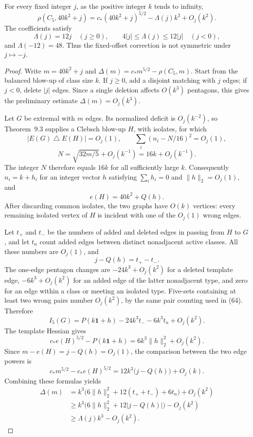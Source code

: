 \begin{theorem}\label{thm:fixed-offset}
For every fixed integer $j$, as the positive integer $k$ tends to infinity,
\begin{equation}\tag{69}\label{eq:fixed-offset-asymptotic}
 \rho(C_5,40k^2+j)
   =c_\ast(40k^2+j)^{5/2}-\Lambda(j)k^3+O_j(k^2).
\end{equation}
The coefficients satisfy
\[
 \Lambda(j)=12j\quad(j\geq0),\qquad
 4|j|\leq\Lambda(j)\leq12|j|\quad(j<0),
\]
and $\Lambda(-12)=48$. Thus the fixed-offset correction is not symmetric
under $j\mapsto-j$.
\end{theorem}
\begin{proof}
Write $m=40k^2+j$ and $\Delta(m)=c_\ast m^{5/2}-\rho(C_5,m)$. Start
from the balanced blow-up of class size $k$. If $j\geq0$, add a disjoint
matching with $j$ edges; if $j<0$, delete $|j|$ edges. Since a single
deletion affects $O(k^3)$ pentagons, this gives the preliminary estimate
$\Delta(m)=O_j(k^3)$.

Let $G$ be extremal with $m$ edges. Its normalized deficit is
$O_j(k^{-2})$, so Theorem~9.3 supplies a Clebsch blow-up $H$, with
isolates, for which
\[
 |E(G)\mathbin\triangle E(H)|=O_j(1),\qquad
 \sum_i(n_i-N/16)^2=O_j(1),
\]
\[
 N=\sqrt{32m/5}+O_j(k^{-1})=16k+O_j(k^{-1}).
\]
The integer $N$ therefore equals $16k$ for all sufficiently large $k$.
Consequently $n_i=k+h_i$ for an integer vector $h$ satisfying
$\sum_i h_i=0$ and $\lVert h\rVert_2=O_j(1)$, and
\begin{equation}\tag{70}\label{eq:offset-edge-count}
 e(H)=40k^2+Q(h).
\end{equation}
After discarding common isolates, the two graphs have $O(k)$ vertices:
every remaining isolated vertex of $H$ is incident with one of the
$O_j(1)$ wrong edges.

Let $t_+$ and $t_-$ be the numbers of added and deleted edges in passing
from $H$ to $G$, and let $t_n$ count added edges between distinct
nonadjacent active classes. All these numbers are $O_j(1)$, and
\[
 j-Q(h)=t_+-t_-.
\]
The one-edge pentagon changes are $-24k^3+O_j(k^2)$ for a deleted
template edge, $-6k^3+O_j(k^2)$ for an added edge of the latter
nonadjacent type, and zero for an edge within a class or meeting an
isolated type. Five-sets containing at least two wrong pairs number
$O_j(k^2)$, by the same pair counting used in (64). Therefore
\[
 I_5(G)=P(k\mathbf1+h)-24k^3t_--6k^3t_n+O_j(k^2).
\]
The template Hessian gives
\[
 c_\ast e(H)^{5/2}-P(k\mathbf1+h)
   =6k^3\lVert h\rVert_2^2+O_j(k^2).
\]
Since $m-e(H)=j-Q(h)=O_j(1)$, the comparison between the two edge
powers is
\[
 c_\ast m^{5/2}-c_\ast e(H)^{5/2}
   =12k^3\bigl(j-Q(h)\bigr)+O_j(k).
\]
Combining these formulas yields
\begin{align*}
 \Delta(m)
 &=k^3\bigl(6\lVert h\rVert_2^2+12(t_++t_-)+6t_n\bigr)+O_j(k^2)\\
 &\geq k^3\bigl(6\lVert h\rVert_2^2+12|j-Q(h)|\bigr)-O_j(k^2)\\
 &\geq\Lambda(j)k^3-O_j(k^2).
\end{align*}


\end{proof}
